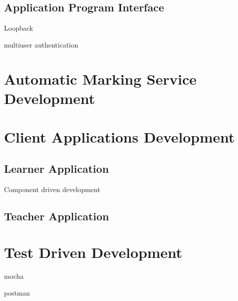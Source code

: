 \subsection{Application Program Interface}

Loopback

multiuser authentication

\section{Automatic Marking Service Development}

\section{Client Applications Development}

\subsection{Learner Application}
Component driven development

\subsection{Teacher Application}


\section{Test Driven Development}

mocha

postman
